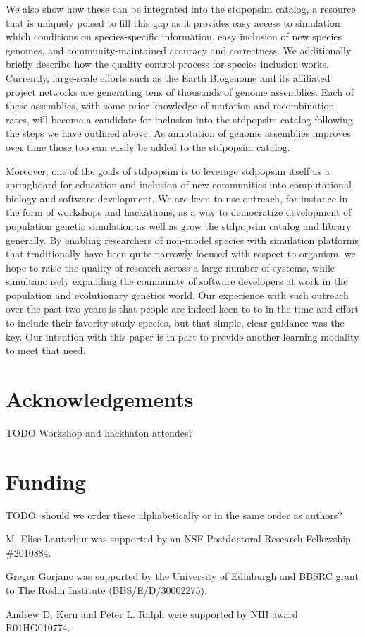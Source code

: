 \documentclass[hidelinks]{article}
\begin{document}
We also show how these can be integrated into the stdpopsim catalog, a
resource that is uniquely poised to fill this gap as it provides easy
access to simulation which conditions on species-specific information,
easy inclusion of new species genomes, and community-maintained accuracy
and correctness. We additionally briefly describe how the quality control 
process for species inclusion works. Currently, large-scale efforts such as the Earth Biogenome
and its affiliated project networks are generating tens of thousands of genome
assemblies. Each of these assemblies, with some prior knowledge of mutation and
recombination rates, will become a candidate for inclusion into the
stdpopsim catalog following the steps we have outlined above. As
annotation of genome assemblies improves over time those too can easily
be added to the stdpopsim catalog.

Moreover, one of the goals of stdpopsim is to leverage stdpopsim itself
as a springboard for education and inclusion of new communities into
computational biology and software development. We are keen to use
outreach, for instance in the form of workshops and hackathons, as a way
to democratize development of population genetic simulation as well as
grow the stdpopsim catalog and library generally. By enabling
researchers of non-model species with simulation platforms that
traditionally have been quite narrowly focused with respect to organism,
we hope to raise the quality of research across a large number of
systems, while simultanousely expanding the community of software
developers at work in the population and evolutionary genetics world.
Our experience with such outreach over the past two years is that people
are indeed keen to to in the time and effort to include their favority
study species, but that simple, clear guidance was the key. Our
intention with this paper is in part to provide another learning
modality to meet that need.

\hypertarget{acknowledgements}{%
\section*{Acknowledgements}\label{acknowledgements}}

TODO Workshop and hackhaton attendes?

\hypertarget{funding}{%
\section*{Funding}\label{funding}}

TODO: should we order these alphabetically or in the same order as authors?

M. Elise Lauterbur was supported by an NSF Postdoctoral Research Fellowship \#2010884.

Gregor Gorjanc was supported by the University of Edinburgh and BBSRC grant to The Roslin Institute (BBS/E/D/30002275).

Andrew D. Kern and Peter L. Ralph were supported by NIH award R01HG010774.


\end{document}
